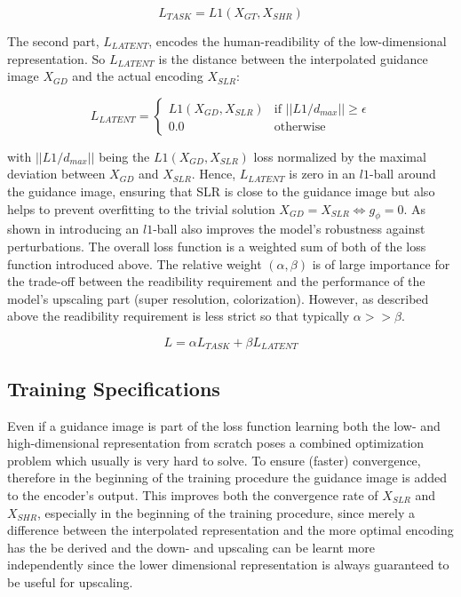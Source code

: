 $$L_{TASK} = L1(X_{GT}, X_{SHR})$$

The second part, $L_{LATENT}$, encodes the human-readibility of the low-dimensional
representation. So $L_{LATENT}$ is the distance between the interpolated guidance
image $X_{GD}$ and the actual encoding $X_{SLR}$:

$$L_{LATENT} = \begin{cases}
L1(X_{GD}, X_{SLR}) & \text{if } ||L1/d_{max}|| \geq \epsilon
\\ 0.0 & \text{otherwise}
\end{cases}$$

with $||L1/d_{max}||$ being the $L1(X_{GD}, X_{SLR})$ loss normalized
by the maximal deviation between $X_{GD}$ and $X_{SLR}$. Hence, $L_{LATENT}$
is zero in an $l1$-ball around the guidance image, ensuring that \ac{SLR} is
close to the guidance image but also helps to prevent overfitting to the trivial
solution $X_{GD} = X_{SLR} \Leftrightarrow g_\phi = 0$. As shown in
 introducing an $l1$-ball also improves
the model's robustness against perturbations.
\newline
The overall loss function is a weighted sum of both of the loss function
introduced above. The relative weight $(\alpha, \beta)$ is of large importance
for the trade-off between the readibility requirement and the performance of the
model's upscaling part (super resolution, colorization). However, as described
above the readibility requirement is less strict so that typically
$\alpha >> \beta$.

$$L = \alpha L_{TASK} + \beta L_{LATENT}$$

\subsection{Training Specifications}
\label{sec:Approach_TS}
Even if a guidance image is part of the loss function learning both the low-
and high-dimensional representation from scratch poses a combined optimization
problem which usually is very hard to solve. To ensure (faster) convergence,
therefore in the beginning of the training procedure the guidance image is
added to the encoder's output. This improves both the convergence rate of
$X_{SLR}$ and $X_{SHR}$, especially in the beginning of the training procedure,
since merely a difference between the interpolated representation and the more
optimal encoding has the be derived and the down- and upscaling can be learnt
more independently since the lower dimensional representation is always
guaranteed to be useful for upscaling.

